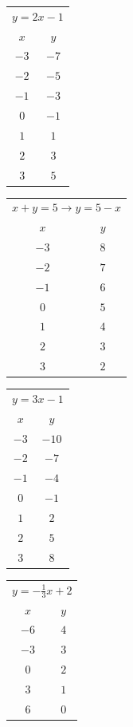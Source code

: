 \documentclass[letter]{article}
\begin{document}
\begin{center}
\begin{tabular}{c|c}
\multicolumn{2}{c}{$y=2x-1$}\\
$x$ & $y$\\\hline
$-3$ & $-7$\\$-2$ & $-5$\\$-1$ & $-3$\\$0$ & $-1$\\$1$ & $1$\\$2$ & $3$\\$3$ & $5$
\end{tabular}\quad
\begin{tabular}{c|c}
\multicolumn{2}{c}{$x+y=5\to y=5-x$}\\
$x$ & $y$\\\hline
$-3$ & $8$\\$-2$ & $7$\\$-1$ & $6$\\$0$ & $5$\\$1$ & $4$\\$2$ & $3$\\$3$ & $2$
\end{tabular}\quad
\begin{tabular}{c|c}
\multicolumn{2}{c}{$y=3x-1$}\\
$x$ & $y$\\\hline
$-3$ & $-10$\\$-2$ & $-7$\\$-1$ & $-4$\\$0$ & $-1$\\$1$ & $2$\\$2$ & $5$\\$3$ & $8$
\end{tabular}\quad
\begin{tabular}{c|c}
\multicolumn{2}{c}{$y=-\frac13x+2$}\\
$x$ & $y$\\\hline
$-6$ & $4$\\$-3$ & $3$\\$0$ & $2$\\$3$ & $1$\\$6$ & $0$
\end{tabular}
\end{center}
\end{document}
